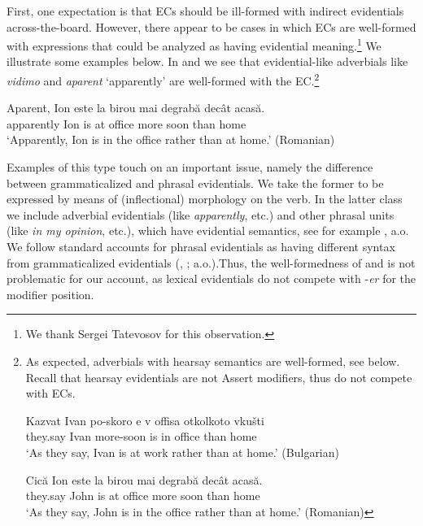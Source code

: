 \documentclass[output=paper,
]{langscibook}
\begin{document}
First, one expectation is that ECs should be ill-formed with indirect evidentials across-the-board. However, there appear to be cases in which ECs are well-formed with expressions that could be analyzed as having evidential meaning.\footnote{We thank Sergei Tatevosov for this observation.}
We illustrate some examples below. In  and  we see that evidential-like adverbials like \textit{vidimo} and \textit{aparent} `apparently' are well-formed with the EC.\footnote{As expected, adverbials with hearsay semantics are well-formed, see below. Recall that hearsay evidentials are not Assert modifiers, thus do not compete with ECs.

	\ea \gll Kazvat Ivan po-skoro e v offisa otkolkoto  vkušti \\
	they.say Ivan	more-soon is 	in	office	than home \\ 
	\glt `As they say, Ivan is at work rather than at home.' \hfill (Bulgarian)
	\z
	
    \ea \gll Cică Ion este la birou mai degrabă decât acasă. \\
	they.say John is at office more soon than home\\ 
	\glt `As they say, John is in the office rather than at home.' \hfill (Romanian)
	\z
	
	}

	 \label{lexevidbul}
    \z 

	\ea \gll Aparent, Ion este la birou mai degrabă decât acasă. \\
	apparently Ion is at office more soon than home\\
	\glt `Apparently, Ion is in the office rather than at home.' \hfill (Romanian)\label{lexevidrom}
    \z 

\noindent Examples of this type touch on an important issue, namely the difference between grammaticalized and phrasal evidentials. We take the former to be expressed by means of (inflectional) morphology on the verb. In the latter class we include adverbial evidentials (like \textit{apparently}, etc.) and other phrasal units (like \textit{in my opinion}, etc.), which have evidential semantics, see for example \citealt{aikh14}, a.o. We follow standard accounts for phrasal evidentials as having different syntax from grammaticalized evidentials (\citealt{fall02}, \citealt{aikh14}; a.o.).Thus, the well-formedness of  and  is not problematic for our account, as lexical evidentials do not compete with -\textit{er} for the  modifier position.
\end{document}
